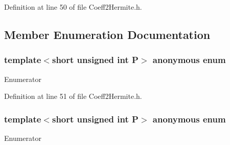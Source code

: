 Definition at line 50 of file Coeff2\+Hermite.\+h.



\subsection{Member Enumeration Documentation}
\hypertarget{structmodel_1_1_fill_c2_h0_3_01_p_00_010_00_010_01_4_a73f64d71a171d8109cb181cc595154db}{}\subsubsection[{anonymous enum}]{\setlength{\rightskip}{0pt plus 5cm}template$<$short unsigned int P$>$ anonymous enum}\label{structmodel_1_1_fill_c2_h0_3_01_p_00_010_00_010_01_4_a73f64d71a171d8109cb181cc595154db}
\begin{Desc}
\item[Enumerator]\par
\begin{description}
\item[{\em 
\hypertarget{structmodel_1_1_fill_c2_h0_3_01_p_00_010_00_010_01_4_a73f64d71a171d8109cb181cc595154dba52a096241b64af7ea48a3f98ceb73b4b}{}i\label{structmodel_1_1_fill_c2_h0_3_01_p_00_010_00_010_01_4_a73f64d71a171d8109cb181cc595154dba52a096241b64af7ea48a3f98ceb73b4b}
}]\end{description}
\end{Desc}


Definition at line 51 of file Coeff2\+Hermite.\+h.

\hypertarget{structmodel_1_1_fill_c2_h0_3_01_p_00_010_00_010_01_4_a1c6c0c645f5c6bd31e269bae9bb1f824}{}\subsubsection[{anonymous enum}]{\setlength{\rightskip}{0pt plus 5cm}template$<$short unsigned int P$>$ anonymous enum}\label{structmodel_1_1_fill_c2_h0_3_01_p_00_010_00_010_01_4_a1c6c0c645f5c6bd31e269bae9bb1f824}
\begin{Desc}
\item[Enumerator]\par
\begin{description}
\item[{\em 
\hypertarget{structmodel_1_1_fill_c2_h0_3_01_p_00_010_00_010_01_4_a1c6c0c645f5c6bd31e269bae9bb1f824a793e0c28e1a6a59fbc412d9045d88e64}{}j\label{structmodel_1_1_fill_c2_h0_3_01_p_00_010_00_010_01_4_a1c6c0c645f5c6bd31e269bae9bb1f824a793e0c28e1a6a59fbc412d9045d88e64}
}]\end{description}
\end{Desc}


